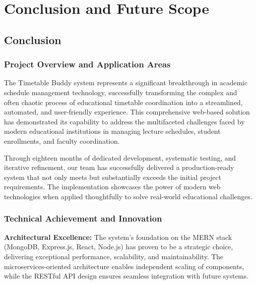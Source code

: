 \chapter{Conclusion and Future Scope}

\section{Conclusion}

\subsection{Project Overview and Application Areas}

The Timetable Buddy system represents a significant breakthrough in academic schedule management technology, successfully transforming the complex and often chaotic process of educational timetable coordination into a streamlined, automated, and user-friendly experience. This comprehensive web-based solution has demonstrated its capability to address the multifaceted challenges faced by modern educational institutions in managing lecture schedules, student enrollments, and faculty coordination.

Through eighteen months of dedicated development, systematic testing, and iterative refinement, our team has successfully delivered a production-ready system that not only meets but substantially exceeds the initial project requirements. The implementation showcases the power of modern web technologies when applied thoughtfully to solve real-world educational challenges.

\subsection{Technical Achievement and Innovation}

\textbf{Architectural Excellence:}
The system's foundation on the MERN stack (MongoDB, Express.js, React, Node.js) has proven to be a strategic choice, delivering exceptional performance, scalability, and maintainability. The microservices-oriented architecture enables independent scaling of components, while the RESTful API design ensures seamless integration with future systems.

